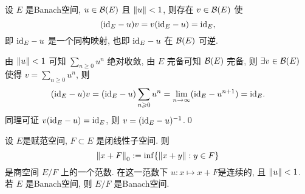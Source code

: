 \begin{Theorem}
	设 $ E $ 是Banach空间,  $ u\in\mathcal{B}(E) $ 且 $ \left\| u \right\|<1 $, 则存在 $ v\in\mathcal{B}(E) $ 使
	\[
		(\mathrm{id}_{E}-u)v=v(\mathrm{id}_{E}-u)=\mathrm{id}_{E},
	\]
	即 $ \mathrm{id}_{E}-u $ 是一个同构映射, 也即 $ \mathrm{id}_{E}-u $ 在 $ \mathcal{B}(E) $ 可逆.
\end{Theorem}
\begin{Proof}
	由 $ \left\| u \right\|<1 $ 可知 $ \sum\limits_{n\geqslant0}u^n $ 绝对收敛, 由 $ E $ 完备可知 $ \mathcal{B}
		(E) $ 完备, 则 $ \exists v\in\mathcal{B}(E) $ 使得 $ v=\sum\limits_{n\geqslant 0}u^n $, 则
	\[
		(\mathrm{id}_E-u)v=(\mathrm{id}_E-u)\sum_{n\geqslant 0}u^n=\lim_{n\to\infty}(\mathrm{id}_E-u^{n+1})=\mathrm{id}_E.
	\]
	同理可证 $ v(\mathrm{id}_E-u)=\mathrm{id}_E $, 则 $ v=(\mathrm{id}_E-u)^{-1} $.\qed
\end{Proof}

\begin{Theorem}
	设 $ E $是赋范空间, $ F\subset E $ 是闭线性子空间. 则
	\[
		\left\| x+F \right\|_0:=\inf\{ \left\| x+y \right\| : y\in F \}
	\]
	是商空间 $ E/F $ 上的一个范数. 在这一范数下 $ u : x\mapsto x+F $是连续的, 且 $ \left\| u \right\|<1 $. 若 $ E $ 是Banach空间, 则 $ E/F $ 是Banach空间.
\end{Theorem}
